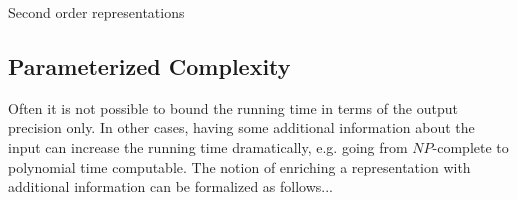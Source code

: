 		Second order representations
 	\subsection{Parameterized Complexity}
 		Often it is not possible to bound the running time in terms of the output precision only.
 		In other cases, having some additional information about the input can increase the running time dramatically,
 		e.g. going from $NP$-complete to polynomial time computable.
 		The notion of enriching a representation with additional information can be formalized as follows...
	
